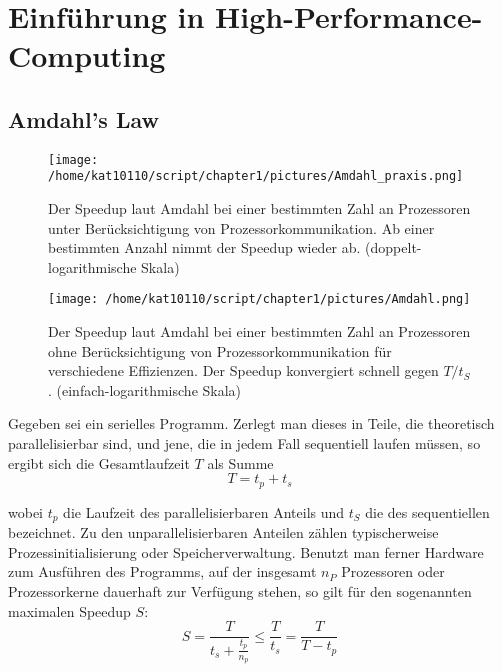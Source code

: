 	\chapter{Einf\"uhrung in High-Performance-Computing} 
		\section{Amdahl's Law}
		\begin{figure}[h]
			\centering
    		\texttt{[image: /home/kat10110/script/chapter1/pictures/Amdahl\_praxis.png]}
    		\caption[Speedup laut Amdahl mit Prozesskommunikation]{Der Speedup laut Amdahl bei einer bestimmten Zahl an Prozessoren unter Berücksichtigung von Prozessorkommunikation. Ab einer bestimmten Anzahl nimmt der Speedup wieder ab. (doppelt-logarithmische Skala) \autocite{carch}}
    		\label{1:am_prax}
		\end{figure}
		\begin{figure}[t]
			\centering
    		\texttt{[image: /home/kat10110/script/chapter1/pictures/Amdahl.png]}
    		\caption[Speedup laut Amdahl ohne Prozesskommunikation]{Der Speedup laut Amdahl bei einer bestimmten Zahl an Prozessoren ohne Berücksichtigung von Prozessorkommunikation f\"ur verschiedene Effizienzen. Der Speedup konvergiert schnell gegen $T/t_S$. (einfach-logarithmische Skala) \autocite{wikiAmdahl}}
    		\label{1:am}
		\end{figure}
		
		Gegeben sei ein serielles Programm. Zerlegt man dieses in Teile, die theoretisch parallelisierbar sind, und jene, die in jedem Fall sequentiell laufen müssen, so ergibt sich die Gesamtlaufzeit $T$ als Summe 
		\begin{equation}\label{eq1:am}
		    T = t_p + t_s
        \end{equation}
        
        wobei $t_p$ die Laufzeit des parallelisierbaren Anteils und $t_S$ die des sequentiellen bezeichnet. Zu den unparallelisierbaren Anteilen zählen typischerweise Prozessinitialisierung oder Speicherverwaltung. Benutzt man ferner Hardware zum Ausführen des Programms, auf der insgesamt $n_P$ Prozessoren oder Prozessorkerne dauerhaft zur Verfügung stehen, so gilt für den sogenannten maximalen Speedup $S$:
		\begin{equation}
		    S = \frac{T}{t_s + \frac{t_p}{n_p}} \leq \frac{T}{t_s} = \frac{T}{T-t_p}
        \end{equation}	   
		
